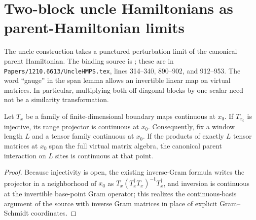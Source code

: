 \section{Two-block uncle Hamiltonians as parent-Hamiltonian limits}
\label{sec:two_block_uncle}

The uncle construction takes a punctured perturbation limit of the canonical
parent Hamiltonian. The binding source is
\cite[continuity-of-projector lemma, span-invariance lemma, and form theorem]{FernandezGonzalez2015Uncle};
these are in \texttt{Papers/1210.6613/UncleHMPS.tex}, lines 314--340,
890--902, and 912--953.
The word ``gauge'' in the span lemma allows an invertible linear map on
virtual matrices. In particular, multiplying both off-diagonal blocks by
one scalar need not be a similarity transformation.

\begin{lemma}
    \label{lem:uncle_local_projector_continuity}
    \leanok
    Let $T_x$ be a family of finite-dimensional boundary maps continuous at
    $x_0$. If $T_{x_0}$ is injective, its range projector is continuous at
    $x_0$. Consequently, fix a window length $L$ and a tensor family
    continuous at $x_0$. If the products of exactly $L$ tensor matrices at
    $x_0$ span the full virtual matrix algebra, the canonical parent
    interaction on $L$ sites is continuous at that point.
\end{lemma}
\begin{proof}
    \leanok
    Because injectivity is open, the existing inverse-Gram formula writes the
    projector in a neighborhood of $x_0$ as
    $T_x(T_x^\dagger T_x)^{-1}T_x^\dagger$, and inversion is continuous at the
    invertible base-point Gram operator; this realizes the continuous-basis
    argument of the source with inverse Gram matrices in place of explicit
    Gram--Schmidt coordinates.
\end{proof}

